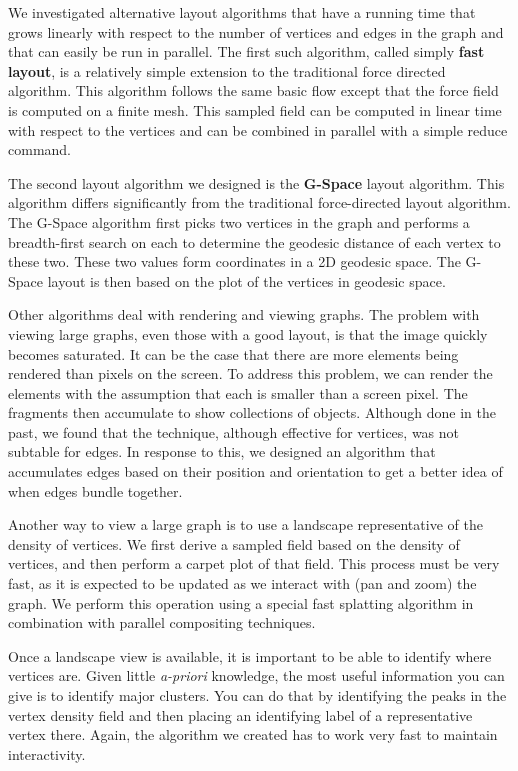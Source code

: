\documentclass[pdf,12pt,report,strict]{SANDreport}
\newcommand*{\keyterm}[1]{\textbf{#1}}
\newcommand*{\keytermidx}[1]{\keyterm{#1}\index{#1}}
\begin{document}

We investigated alternative layout algorithms that have a running time that
grows linearly with respect to the number of vertices and edges in the
graph and that can easily be run in parallel.  The first such algorithm,
called simply \keyterm{fast layout}, is a relatively
simple extension to the traditional force directed algorithm.  This
algorithm follows the same basic flow except that the force field is
computed on a finite mesh.  This sampled field can be computed in linear
time with respect to the vertices and can be combined in parallel with a
simple reduce command.


The second layout algorithm we designed is the
\keytermidx{G-Space} layout algorithm.  This algorithm differs
significantly from the traditional force-directed layout algorithm.  The
G-Space algorithm first picks two vertices in the graph and performs a
breadth-first search on each to determine the geodesic distance of each
vertex to these two.  These two values form coordinates in a 2D geodesic
space.  The G-Space layout is then based on the plot of the vertices in
geodesic space.

Other algorithms deal with rendering and viewing graphs.  The problem with
viewing large graphs, even those with a good layout, is that the image
quickly becomes saturated.  It can be the case that there are more elements
being rendered than pixels on the screen.  To address this problem, we can
render the elements with the assumption that each is smaller than a screen
pixel.  The fragments then accumulate to show collections of objects.
Although done in the past, we found that the technique, although effective
for vertices, was not subtable for edges.  In response to this, we designed
an algorithm that accumulates edges based on their position and orientation
to get a better idea of when edges bundle together.

Another way to view a large graph is to use a landscape representative of
the density of vertices.  We first derive a sampled field based on the
density of vertices, and then perform a carpet plot of that field.  This
process must be very fast, as it is expected to be updated as we interact
with (pan and zoom) the graph.  We perform this operation using a special
fast splatting algorithm in combination with parallel compositing
techniques.

Once a landscape view is available, it is important to be able to identify
where vertices are.  Given little \emph{a-priori} knowledge, the most
useful information you can give is to identify major clusters.  You can do
that by identifying the peaks in the vertex density field and then placing
an identifying label of a representative vertex there.  Again, the
algorithm we created has to work very fast to maintain interactivity.
\end{document}
